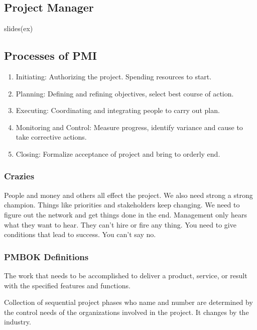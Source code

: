 \documentclass[english, 11pt]{article}
\begin{document}
\subsection{Project Manager}
slides(ex)

\subsection{Processes of PMI}

\begin{enumerate}
  \item Initiating: Authorizing the project. Spending resources to start.
  \item Planning: Defining and refining objectives, select best course of action.
  \item Executing: Coordinating and integrating people to carry out plan.
  \item Monitoring and Control: Measure progress, identify variance and cause to take corrective actions.
  \item Closing: Formalize acceptance of project and bring to orderly end.
\end{enumerate}

\subsubsection*{Crazies}

People and money and others all effect the project. We also need strong a strong champion. Things like priorities and stakeholders keep changing. We need to figure out the network and get things done in the end. Management only hears what they want to hear. They can't hire or fire any thing. You need to give conditions that lead to success. You can't say no.

\subsubsection{PMBOK Definitions}\label{pmbok}

\begin{defn}\label{scope}
The work that needs to be accomplished to deliver a product, service, or result with the specified features and functions.
\end{defn}

\begin{defn}\label{plc}
Collection of sequential project phases who name and number are determined by the control needs of the organizations involved in the project. It changes by the industry.
\end{defn}
\end{document}
